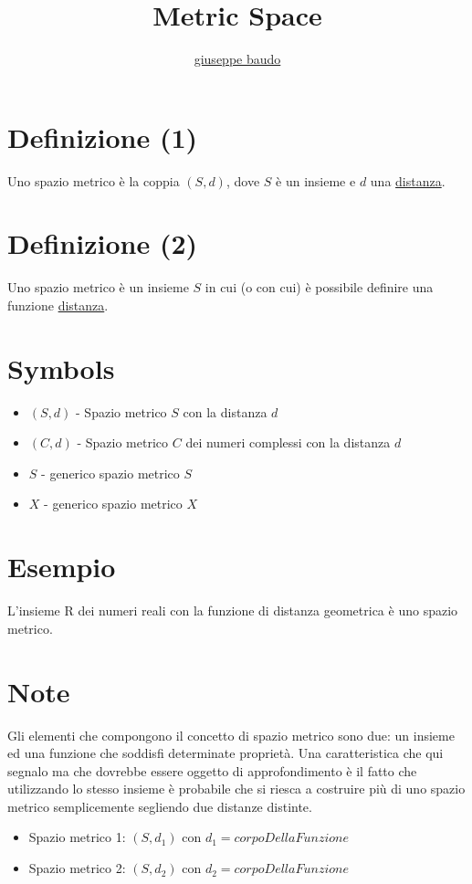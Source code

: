\documentclass[a4paper,10pt]{article}
\title{Metric Space}
\author{\href{http://www.baudo.hol.es}{giuseppe baudo}}
\begin{document}
\maketitle

\section{Definizione (1)}
Uno spazio metrico è la coppia $(S, d)$, dove $S$ è un insieme e $d$ una \href{Distanza.html}{distanza}.

\section{Definizione (2)}
Uno spazio metrico è un insieme $S$ in cui (o con cui) è possibile definire una funzione \href{Distanza.html}{distanza}.

\section{Symbols}
\begin{itemize}
 \item $(S, d)$ - Spazio metrico $S$ con la distanza $d$
 \item $(C, d)$ - Spazio metrico $C$ dei numeri complessi con la distanza $d$
 \item $S$ - generico spazio metrico $S$ 
 \item $X$ - generico spazio metrico $X$  
\end{itemize}

\section{Esempio}
L'insieme R dei numeri reali con la funzione di distanza geometrica è uno spazio metrico.

\section{Note}
Gli elementi che compongono il concetto di spazio metrico sono due: un insieme ed una funzione che soddisfi determinate proprietà. Una caratteristica che qui segnalo ma che dovrebbe essere oggetto di approfondimento
è il fatto che utilizzando lo stesso insieme è probabile che si riesca a costruire più di uno spazio metrico semplicemente segliendo due distanze distinte.

\begin{itemize}
 \item Spazio metrico 1: $(S, d_1)$ con $d_1=corpoDellaFunzione$
 \item Spazio metrico 2: $(S, d_2)$ con $d_2=corpoDellaFunzione$
\end{itemize}
\end{document}
